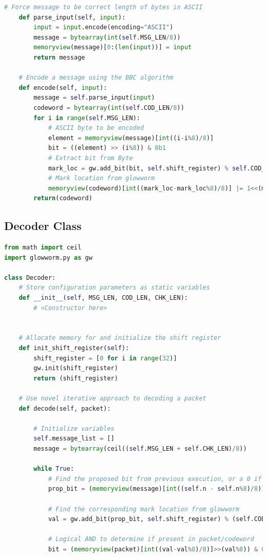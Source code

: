 \documentclass[conference]{IEEEtran}
\begin{document}
{\begin{lstlisting}[language=Python]
    # Force message to be correct length of bytes in ASCII
    def parse_input(self, input):
        input = input.encode(encoding="ASCII")
        message = bytearray(int(self.MSG_LEN/8))
        memoryview(message)[0:(len(input))] = input
        return message

    # Encode a message using the BBC algorithm
    def encode(self, input):
        message = self.parse_input(input)
        codeword = bytearray(int(self.COD_LEN/8))
        for i in range(self.MSG_LEN):
            # ASCII byte to be encoded
            element = memoryview(message)[int((i-i%8)/8)]
            bit = ((element) >> (i%8)) & 0b1
            # Extract bit from Byte
            mark_loc = gw.add_bit(bit, self.shift_register) % self.COD_LEN
            # Mark location from glowworm
            memoryview(codeword)[int((mark_loc-mark_loc%8)/8)] |= 1<<(mark_loc%8)
        return(codeword)
\end{lstlisting} 
    

\newpage
\subsection{Decoder Class}
\label{PyDecoder}
\begin{lstlisting}[language=Python]
from math import ceil
import glowworm.py as gw

class Decoder:
    # Store configuration parameters as static variables
    def __init__(self, MSG_LEN, COD_LEN, CHK_LEN):
        # <Constructor here>


    # Allocate memory for and initialize the shift register
    def init_shift_register(self):
        shift_register = [0 for i in range(32)]
        gw.init(shift_register)
        return (shift_register)

    # Use novel iterative approach to decoding a packet
    def decode(self, packet):
    
        # Initialize variables
        self.message_list = []
        message = bytearray(ceil((self.MSG_LEN + self.CHK_LEN)/8))

        while True:
            # Find the proposed bit from previous execution, or a 0 if initial iteration
            prop_bit = (memoryview(message)[int((self.n - self.n%8)/8)]>>(self.n%8)) & 0b1
            
            # Find the corresponding mark location from glowworm
            val = gw.add_bit(prop_bit, self.shift_register) % (self.COD_LEN)
            
            # Logical AND to determine if present in packet/codeword
            bit = (memoryview(packet)[int((val-val%8)/8)]>>(val%8)) & 0b1


\end{lstlisting}}
\end{document}
